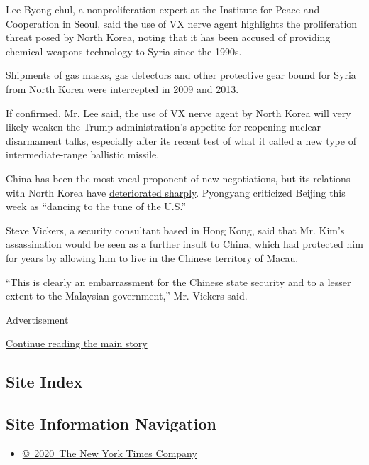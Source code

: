 Lee Byong-chul, a nonproliferation expert at the Institute for Peace and
Cooperation in Seoul, said the use of VX nerve agent highlights the
proliferation threat posed by North Korea, noting that it has been
accused of providing chemical weapons technology to Syria since the
1990s.

Shipments of gas masks, gas detectors and other protective gear bound
for Syria from North Korea were intercepted in 2009 and 2013.

If confirmed, Mr. Lee said, the use of VX nerve agent by North Korea
will very likely weaken the Trump administration's appetite for
reopening nuclear disarmament talks, especially after its recent test of
what it called a new type of intermediate-range ballistic missile.

China has been the most vocal proponent of new negotiations, but its
relations with North Korea have
\href{https://www.nytimes.com/2017/02/24/world/asia/china-north-korea-relations-kim-jong-un.html}{deteriorated
sharply}. Pyongyang criticized Beijing this week as ``dancing to the
tune of the U.S.''

Steve Vickers, a security consultant based in Hong Kong, said that Mr.
Kim's assassination would be seen as a further insult to China, which
had protected him for years by allowing him to live in the Chinese
territory of Macau.

``This is clearly an embarrassment for the Chinese state security and to
a lesser extent to the Malaysian government,'' Mr. Vickers said.

Advertisement

\protect\hyperlink{after-bottom}{Continue reading the main story}

\hypertarget{site-index}{%
\subsection{Site Index}\label{site-index}}

\hypertarget{site-information-navigation}{%
\subsection{Site Information
Navigation}\label{site-information-navigation}}

\begin{itemize}
\tightlist
\item
  \href{https://help.nytimes.com/hc/en-us/articles/115014792127-Copyright-notice}{©~2020~The
  New York Times Company}
\end{itemize}

